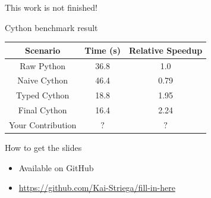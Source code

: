 \documentclass[12pt,xcolor=dvipsnames]{beamer}
\begin{document}
    \begin{frame}
        This work is not finished!
    \end{frame}

    \begin{frame}{Cython benchmark result}
        \begin{center}
        \begin{tabular}{ | c | c | c | }
            \hline
            Scenario & Time (s) & Relative Speedup \\
            \hline
            Raw Python & 36.8 & 1.0 \\
            Naive Cython & 46.4 & 0.79 \\
            Typed Cython & 18.8 & 1.95 \\
            Final Cython & 16.4 & 2.24 \\
            Your Contribution & $?$ & $?$ \\
            \hline
        \end{tabular}
        \end{center}
    \end{frame}

    \begin{frame}{How to get the slides}
        \begin{itemize}
            \item Available on GitHub
            \item \url{https://github.com/Kai-Striega/fill-in-here}
        \end{itemize}
    \end{frame}
\end{document}

